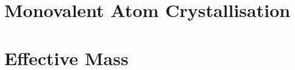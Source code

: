 \documentclass[11pt]{amsart}
\begin{document}

\setcounter{section}{5}

\section{Monovalent Atom Crystallisation}

\section{Effective Mass}
\end{document}
